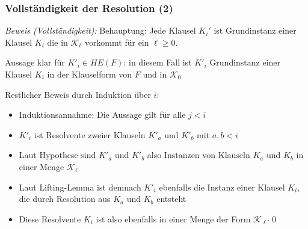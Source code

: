 \documentclass[aspectratio=1610,onlymath]{beamer}
\begin{document}
\begin{frame}[t]\frametitle{Vollständigkeit der Resolution (2)}


\emph{Beweis (Vollständigkeit):} \alert{Behauptung:} Jede Klausel $K_i'$ ist Grundinstanz einer Klausel $K_i$ die in $\mathcal{K}_\ell$ vorkommt für ein $\ell\geq 0$.
\medskip\pause

Aussage klar für $K'_i\in HE(F)$: in diesem Fall ist $K'_i$ Grundinstanz einer Klausel $K_i$ in der Klauselform von $F$ und in $\mathcal{K}_0$\medskip\pause

Restlicher Beweis durch Induktion über $i$:
\begin{itemize}
\item Induktionsannahme: Die Aussage gilt für alle $j<i$\pause
\item $K'_i$ ist Resolvente zweier Klauseln $K'_a$ und $K'_b$ mit $a,b<i$\pause
\item Laut Hypothese sind $K'_a$ und $K'_b$ also Instanzen von Klauseln $K_a$ und $K_b$ in einer Menge $\mathcal{K}_\ell$\pause
\item Laut Lifting-Lemma ist demnach $K'_i$ ebenfalls die Instanz einer Klausel $K_i$, die durch Resolution aus $K_a$ und $K_b$ entsteht\pause
\item Diese Resolvente $K_i$ ist also ebenfalls in einer Menge der Form $\mathcal{K}_{\ell'}$\qed
\end{itemize}

\end{frame}
\end{document}
